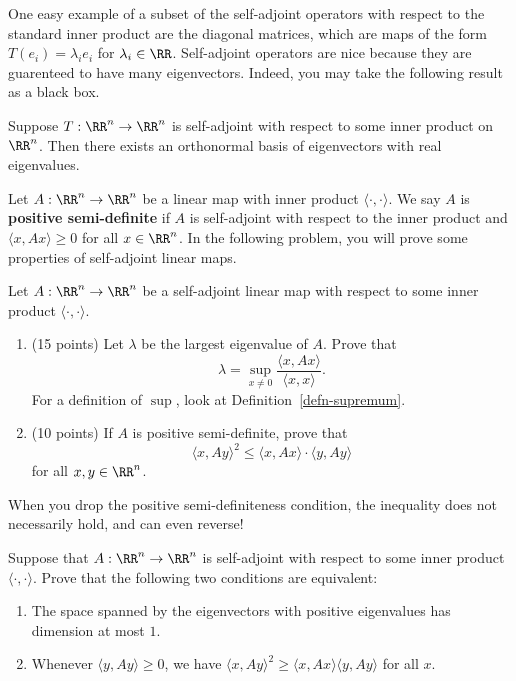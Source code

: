 \documentclass[11pt]{article}
\begin{document}
One easy example of a subset of the self-adjoint operators with respect to the standard inner product are the diagonal matrices, which are maps of the form $T(e_i) = \lambda_i e_i$ for $\lambda_i \in \RR$. Self-adjoint operators are nice because they are guarenteed to have many eigenvectors. Indeed, you may take the following result as a black box. 

\begin{thm}
    Suppose $T : \RR^n \to \RR^n$ is self-adjoint with respect to some inner product on $\RR^n$. Then there exists an orthonormal basis of eigenvectors with real eigenvalues. 
\end{thm}

Let $A : \RR^n \to \RR^n$ be a linear map with inner product $\langle \cdot, \cdot \rangle$. We say $A$ is \textbf{positive semi-definite} if $A$ is self-adjoint with respect to the inner product and $\langle x, Ax \rangle \geq 0$ for all $x \in \RR^n$. In the following problem, you will prove some properties of self-adjoint linear maps. 

\begin{prob}[25 points]
    Let $A : \RR^n \to \RR^n$ be a self-adjoint linear map with respect to some inner product $\langle \cdot, \cdot \rangle$. 
    \begin{enumerate}[label = (\alph*)]
        \item (15 points) Let $\lambda$ be the largest eigenvalue of $A$. Prove that 
        \[
            \lambda = \sup_{x \neq 0} \frac{\langle x, Ax \rangle}{\langle x, x \rangle}.
        \]
        For a definition of $\sup$, look at Definition~\ref{defn-supremum}.

        \item (10 points) If $A$ is positive semi-definite, prove that 
        \[
            \langle x, Ay \rangle^2 \leq \langle x, Ax \rangle \cdot \langle y, Ay \rangle 
        \]
        for all $x, y \in \RR^n$.
    \end{enumerate}
    
\end{prob}

When you drop the positive semi-definiteness condition, the inequality does not necessarily hold, and can even reverse!

\begin{prob} [50 points]
    Suppose that $A : \RR^n \to \RR^n$ is self-adjoint with respect to some inner product $\langle \cdot, \cdot \rangle$. Prove that the following two conditions are equivalent:
    \begin{enumerate}[label = (\roman*)]
        \item The space spanned by the eigenvectors with positive eigenvalues has dimension at most $1$.
        \item Whenever $\langle y, Ay \rangle \geq 0$, we have $\langle x, Ay \rangle^2 \geq \langle x, Ax \rangle \langle y, Ay \rangle$ for all $x$. 
    \end{enumerate}
\end{prob}
\end{document}
